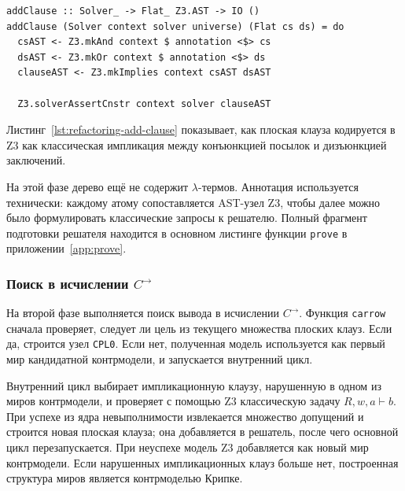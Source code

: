 \documentclass[14pt, russian]{scrartcl}
\begin{document}
\begin{listing}[!htb]
\caption{Добавление плоской клаузы в Z3: \texttt{addClause}}
\label{lst:refactoring-add-clause}
\begin{verbatim}
addClause :: Solver_ -> Flat_ Z3.AST -> IO ()
addClause (Solver context solver universe) (Flat cs ds) = do
  csAST <- Z3.mkAnd context $ annotation <$> cs
  dsAST <- Z3.mkOr context $ annotation <$> ds
  clauseAST <- Z3.mkImplies context csAST dsAST

  Z3.solverAssertCnstr context solver clauseAST
\end{verbatim}
\end{listing}

Листинг~\ref{lst:refactoring-add-clause} показывает, как плоская клауза
кодируется в Z3 как классическая импликация между конъюнкцией посылок и
дизъюнкцией заключений.

На этой фазе дерево ещё не содержит $\lambda$-термов. Аннотация используется
технически: каждому атому сопоставляется AST-узел Z3, чтобы далее можно было
формулировать классические запросы к решателю. Полный фрагмент подготовки
решателя находится в основном листинге функции \texttt{prove} в
приложении~\ref{app:prove}.

\subsubsection{Поиск в исчислении \texorpdfstring{$C^{\rightarrow}$}{C->}}

На второй фазе выполняется поиск вывода в исчислении $C^{\rightarrow}$.
Функция \texttt{carrow} сначала проверяет, следует ли цель из текущего
множества плоских клауз. Если да, строится узел \texttt{CPL0}. Если нет,
полученная модель используется как первый мир кандидатной контрмодели, и
запускается внутренний цикл.

Внутренний цикл выбирает импликационную клаузу, нарушенную в одном из миров
контрмодели, и проверяет с помощью Z3 классическую задачу
$R, w, a \vdash b$. При успехе из ядра невыполнимости извлекается множество
допущений и строится новая плоская клауза; она добавляется в решатель, после
чего основной цикл перезапускается. При неуспехе модель Z3 добавляется как
новый мир контрмодели. Если нарушенных импликационных клауз больше нет,
построенная структура миров является контрмоделью Крипке.
\end{document}
